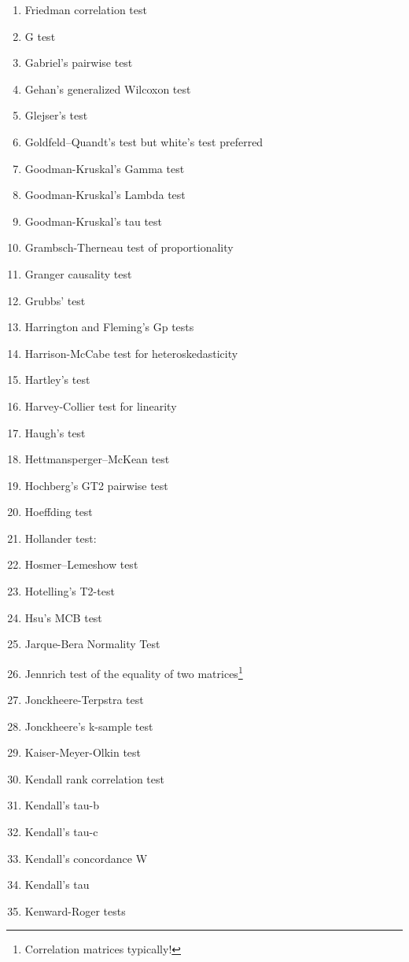 \begin{itemize}
\begin{multicols}{3}
\begin{enumerate}
			\item Friedman correlation test
			\item G test
			\item Gabriel's pairwise test
			\item Gehan's generalized Wilcoxon test
			\item Glejser's test
			\item Goldfeld–Quandt's test but white's test preferred
			\item Goodman-Kruskal's Gamma test
			\item Goodman-Kruskal's Lambda test
			\item Goodman-Kruskal's tau test
			\item Grambsch-Therneau test of proportionality
			\item Granger causality test
			\item Grubbs' test
			\item Harrington and Fleming's Gp tests
			\item Harrison-McCabe test for heteroskedasticity
			\item Hartley's test
			\item Harvey-Collier test for linearity
			\item Haugh's test
			\item Hettmansperger–McKean test
			\item Hochberg's GT2 pairwise test
			\item Hoeffding test
			\item Hollander test:
			\item Hosmer–Lemeshow test
			\item Hotelling's T2-test 
			\item Hsu's MCB test
			\item Jarque-Bera Normality Test
			\item Jennrich test of the equality of two matrices\footnote{Correlation matrices typically!}
			\item Jonckheere-Terpstra test
			\item Jonckheere's k-sample test
			\item Kaiser-Meyer-Olkin test
			\item Kendall rank correlation test
			\item Kendall's tau-b
			\item Kendall's tau-c
			\item Kendall's concordance W
			\item Kendall's tau
			\item Kenward-Roger tests

\end{enumerate}
\end{multicols}
\end{itemize}
